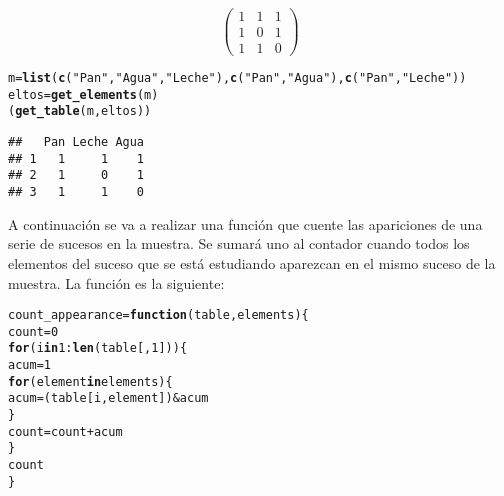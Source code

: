 \documentclass[12pt]{report}\usepackage[]{graphicx}\usepackage[dvipsnames]{xcolor}
\makeatletter
\newcommand{\hlnum}[1]{\textcolor[rgb]{0.686,0.059,0.569}{#1}}%
\newcommand{\hlstr}[1]{\textcolor[rgb]{0.192,0.494,0.8}{#1}}%
\newcommand{\hlopt}[1]{\textcolor[rgb]{0,0,0}{#1}}%
\newcommand{\hlstd}[1]{\textcolor[rgb]{0.345,0.345,0.345}{#1}}%
\newcommand{\hlkwa}[1]{\textcolor[rgb]{0.161,0.373,0.58}{\textbf{#1}}}%
\newcommand{\hlkwb}[1]{\textcolor[rgb]{0.69,0.353,0.396}{#1}}%
\newcommand{\hlkwc}[1]{\textcolor[rgb]{0.333,0.667,0.333}{#1}}%
\newcommand{\hlkwd}[1]{\textcolor[rgb]{0.737,0.353,0.396}{\textbf{#1}}}%
\newenvironment{kframe}{%
 \def\at@end@of@kframe{}%
 \ifinner\ifhmode%
  \def\at@end@of@kframe{\end{minipage}}%
  \begin{minipage}{\columnwidth}%
 \fi\fi%
 \def\FrameCommand##1{\hskip\@totalleftmargin \hskip-\fboxsep
 \colorbox{shadecolor}{##1}\hskip-\fboxsep
     \hskip-\linewidth \hskip-\@totalleftmargin \hskip\columnwidth}%
 \MakeFramed {\advance\hsize-\width
   \@totalleftmargin\z@ \linewidth\hsize
   \@setminipage}}%
 {\par\unskip\endMakeFramed%
 \at@end@of@kframe}
\newenvironment{knitrout}{}{} %
\makeatother
\begin{document}
			$$
			\begin{pmatrix}
				1 & 1 & 1\\
				1 & 0 & 1\\
				1 & 1 & 0
			\end{pmatrix}
			$$
			
\begin{knitrout}
\color{fgcolor}\begin{kframe}
\begin{alltt}
\hlstd{m} \hlkwb{=} \hlkwd{list}\hlstd{(}\hlkwd{c}\hlstd{(}\hlstr{"Pan"}\hlstd{,} \hlstr{"Agua"}\hlstd{,} \hlstr{"Leche"}\hlstd{),} \hlkwd{c}\hlstd{(}\hlstr{"Pan"}\hlstd{,} \hlstr{"Agua"}\hlstd{),} \hlkwd{c}\hlstd{(}\hlstr{"Pan"}\hlstd{,} \hlstr{"Leche"}\hlstd{))}
\hlstd{eltos} \hlkwb{=} \hlkwd{get_elements}\hlstd{(m)}
\hlstd{(}\hlkwd{get_table}\hlstd{(m, eltos))}
\end{alltt}
\begin{verbatim}
##   Pan Leche Agua
## 1   1     1    1
## 2   1     0    1
## 3   1     1    0
\end{verbatim}
\end{kframe}
\end{knitrout}
			
			A continuación se va a realizar una función que cuente las apariciones de una serie de sucesos en la muestra. Se sumará uno al contador cuando todos los elementos del suceso que se está estudiando aparezcan en el mismo suceso de la muestra. La función es la siguiente:
			
\begin{knitrout}
\color{fgcolor}\begin{kframe}
\begin{alltt}
\hlstd{count_appearance} \hlkwb{=} \hlkwa{function}\hlstd{(}\hlkwc{table}\hlstd{,} \hlkwc{elements}\hlstd{) \{}
        \hlstd{count} \hlkwb{=} \hlnum{0}
        \hlkwa{for} \hlstd{(i} \hlkwa{in} \hlnum{1}\hlopt{:}\hlkwd{len}\hlstd{(table[,}\hlnum{1}\hlstd{])) \{}
                \hlstd{acum} \hlkwb{=} \hlnum{1}
                \hlkwa{for} \hlstd{(element} \hlkwa{in} \hlstd{elements) \{}
                        \hlstd{acum} \hlkwb{=} \hlstd{(table[i,element])} \hlopt{&} \hlstd{acum}
                \hlstd{\}}
                \hlstd{count} \hlkwb{=} \hlstd{count} \hlopt{+} \hlstd{acum}
        \hlstd{\}}
        \hlstd{count}
\hlstd{\}}
\end{alltt}
\end{kframe}
\end{knitrout}
			
\end{document}
